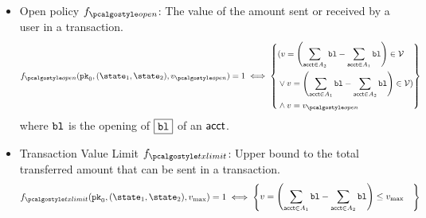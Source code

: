\begin{itemize}
        \item Open policy $f_{\open}$: The value of the amount sent or received by a user in a transaction.
        \begin{align*}
            f_{\open}(\inpk, (\snap_1, \snap_2), v_{\open}) = 1 \iff 
            \left\{ \begin{aligned}   
            & (v = \left(\sum_{\acct \in A_{2}}\varbl - \sum_{\acct \in A_{1}}\varbl \right)\in \vset \\
            &\lor v = \left(\sum_{\acct \in A_{1}}\varbl - \sum_{\acct \in A_{2}}\varbl \right)\in \vset )\\
            & \land v = v_{\open} 
        \end{aligned} \right\}
        \end{align*}
        where $\textup{\texttt{{bl}}}$ is the opening of $\fbox{$\textup{\texttt{{bl}}}$}$ of an $\textup{\textsf{acct}}$.

        \item Transaction Value Limit $f_{\txnlimit}$: Upper bound to the total transferred amount that can be sent in a transaction.
        \begin{align*}
            f_{\txnlimit}(\inpk, (\snap_1, \snap_2), v_{\max}) = 1 \iff  
            \left\{ \begin{aligned} 
            & v = \left(\sum_{\acct \in A_1}\varbl - \sum_{\acct \in A_2}\varbl \right) \leq v_{\max} 
            \end{aligned} \right\}
        \end{align*}
        

\end{itemize}
